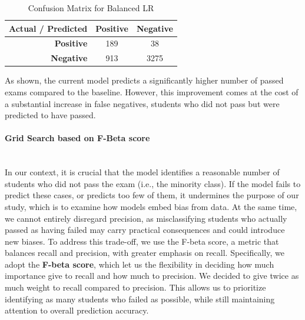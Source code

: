 \documentclass{article}
\begin{document}
\begin{table}[h!]
\centering
\caption{Confusion Matrix for Balanced LR}
\label{tab:confusion_matrix}
\begin{tabular}{r|cc}
\toprule
\textbf{Actual / Predicted} & \textbf{Positive} & \textbf{Negative} \\
\midrule
\textbf{Positive} & 189 & 38 \\
\textbf{Negative} & 913 & 3275 \\
\bottomrule
\end{tabular}
\end{table}
As shown, the current model predicts a significantly higher number of passed exams compared to the baseline. However, this improvement comes at the cost of a substantial increase in false negatives, students who did not pass but were predicted to have passed. \newline
\paragraph{Grid Search based on F-Beta score}\mbox{}\\
In our context, it is crucial that the model identifies a reasonable number of students who did not pass the exam (i.e., the minority class). If the model fails to predict these cases, or predicts too few of them, it undermines the purpose of our study, which is to examine how models embed bias from data. At the same time, we cannot entirely disregard precision, as misclassifying students who actually passed as having failed may carry practical consequences and could introduce new biases.\newline
To address this trade-off, we use the F-beta score, a metric that balances recall and precision, with greater emphasis on recall. Specifically, we adopt the \textbf{F-beta score}, which let us the flexibility in deciding how much importance give to recall and how much to precision. We decided to give twice as much weight to recall compared to precision. This allows us to prioritize identifying as many students who failed as possible, while still maintaining attention to overall prediction accuracy.
\end{document}
